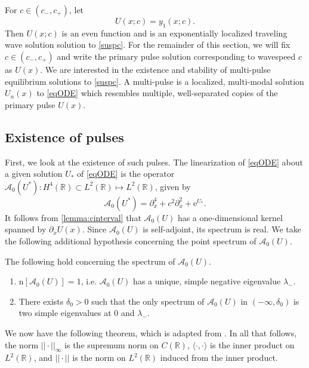 \documentclass[review,onefignum,onetabnum]{siamart171218}
\newcommand{\R}{\mathbb{R}}
\newcommand{\rme}{\mathrm{e}}
\newcommand{\rmn}{\mathrm{n}}
\newcommand{\calA}{\mathcal{A}}
\begin{document}
For $c \in (c_-, c_+)$, let
\begin{equation}\label{suspU}
U(x; c) = y_1(x; c).
\end{equation}
Then $U(x; c)$ is an even function and is an exponentially localized traveling wave solution solution to \cref{suspc}. For the remainder of this section, we will fix $c \in (c_-, c_+)$ and write the primary pulse solution corresponding to wavespeed $c$ as $U(x)$. We are interested in the existence and stability of multi-pulse equilibrium solutions to \cref{suspc}. A multi-pulse is a localized, multi-modal solution $U_n(x)$ to \cref{eqODE} which resembles multiple, well-separated copies of the primary pulse $U(x)$.

\subsection{Existence of pulses}

First, we look at the existence of such pulses. The linearization of \cref{eqODE} about a given solution $U_*$ of \cref{eqODE} is the operator $\calA_0(U^*): H^4(\R) \subset L^2(\R) \mapsto L^2(\R)$, given by
\begin{equation}\label{defA0}
\calA_0(U^*) = \partial_x^4 + c^2 \partial_x^2 + \rme^{U_*}.
\end{equation}
It follows from \cref{lemma:cinterval} that $\calA_0(U)$ has a one-dimensional kernel spanned by $\partial_x U(x)$. Since $\calA_0(U)$ is self-adjoint, its spectrum is real. We take the following additional hypothesis concerning the point spectrum of $\calA_0(U)$.

\begin{hypothesis}\label{A0hyp}
The following hold concerning the spectrum of $\calA_0(U)$.
\begin{enumerate}
\item $\rmn[\calA_0(U)]=1$, i.e. $\calA_0(U)$ has a unique, simple negative eigenvalue $\lambda_-$.
\item There exists $\delta_0 > 0$ such that the only spectrum of $\calA_0(U)$ in $(-\infty, \delta_0)$ is two simple eigenvalues at $0$ and $\lambda_-$.
\end{enumerate}
\end{hypothesis}


We now have the following theorem, which is adapted from \cite[Theorem~3.6]{sandstede:iol97}.
In all that follows, the norm $||\cdot||_\infty$ is the supremum norm on $C(\R)$, $\langle \cdot, \cdot \rangle$ is the inner product on $L^2(\R)$, and $|| \cdot ||$ is the norm on $L^2(\R)$ induced from the inner product.
\end{document}
